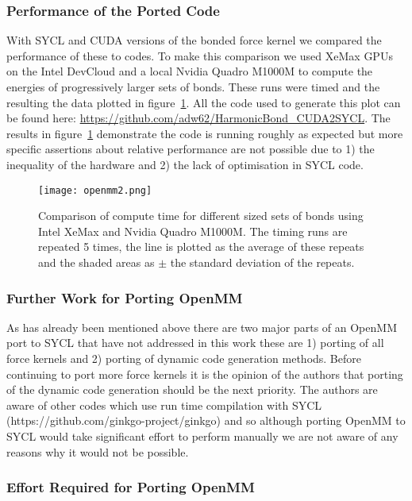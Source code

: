 \documentclass[../main]{subfiles}
\begin{document}
\subsubsection{Performance of the Ported Code}\label{sec:openmm_performance}


With SYCL and CUDA versions of the bonded force kernel we compared the performance of these to codes.
To make this comparison we used XeMax GPUs on the Intel DevCloud and a local Nvidia Quadro M1000M to compute the energies of progressively larger sets of bonds.
These runs were timed and the resulting the data plotted in figure~\ref{fig:openmm}.
All the code used to generate this plot can be found here: \url{https://github.com/adw62/HarmonicBond_CUDA2SYCL}.
The results in figure~\ref{fig:openmm} demonstrate the code is running roughly as expected but more specific assertions about relative performance are not possible due to 1) the inequality of the hardware and 2) the lack of optimisation in SYCL code.

\begin{figure}[!htbp]
	\caption{Comparison of compute time for different sized sets of bonds using Intel XeMax and Nvidia Quadro M1000M. The timing runs are repeated 5 times, the line is plotted as the average of these repeats and the shaded areas as $\pm$ the standard deviation of the repeats.}
	\texttt{[image: openmm2.png]}
	\label{fig:openmm}
\end{figure}

\subsubsection{Further Work for Porting OpenMM}\label{sec:openmm_furtherwork}

As has already been mentioned above there are two major parts of an OpenMM port to SYCL that have not addressed in this work these are 1) porting of all force kernels and 2) porting of dynamic code generation methods.
Before continuing to port more force kernels it is the opinion of the authors that porting of the dynamic code generation should be the next priority.
The authors are aware of other codes which use run time compilation with SYCL (https://github.com/ginkgo-project/ginkgo) and so although porting OpenMM to SYCL would take significant effort to perform manually we are not aware of any reasons why it would not be possible.


\subsubsection{Effort Required for Porting OpenMM}\label{sec:openmm_effort}
\end{document}
